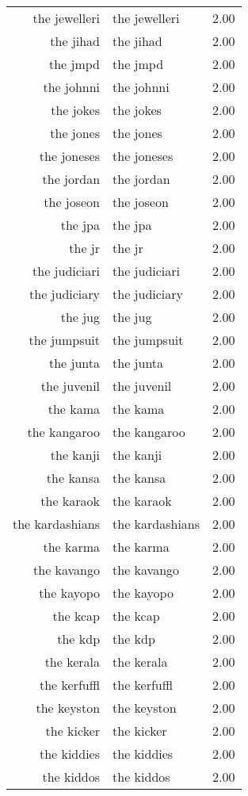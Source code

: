 \begin{table}[ht]
\begin{tabular}{rlr}
  the jewelleri & the jewelleri & 2.00 \\ 
  the jihad & the jihad & 2.00 \\ 
  the jmpd & the jmpd & 2.00 \\ 
  the johnni & the johnni & 2.00 \\ 
  the jokes & the jokes & 2.00 \\ 
  the jones & the jones & 2.00 \\ 
  the joneses & the joneses & 2.00 \\ 
  the jordan & the jordan & 2.00 \\ 
  the joseon & the joseon & 2.00 \\ 
  the jpa & the jpa & 2.00 \\ 
  the jr & the jr & 2.00 \\ 
  the judiciari & the judiciari & 2.00 \\ 
  the judiciary & the judiciary & 2.00 \\ 
  the jug & the jug & 2.00 \\ 
  the jumpsuit & the jumpsuit & 2.00 \\ 
  the junta & the junta & 2.00 \\ 
  the juvenil & the juvenil & 2.00 \\ 
  the kama & the kama & 2.00 \\ 
  the kangaroo & the kangaroo & 2.00 \\ 
  the kanji & the kanji & 2.00 \\ 
  the kansa & the kansa & 2.00 \\ 
  the karaok & the karaok & 2.00 \\ 
  the kardashians & the kardashians & 2.00 \\ 
  the karma & the karma & 2.00 \\ 
  the kavango & the kavango & 2.00 \\ 
  the kayopo & the kayopo & 2.00 \\ 
  the kcap & the kcap & 2.00 \\ 
  the kdp & the kdp & 2.00 \\ 
  the kerala & the kerala & 2.00 \\ 
  the kerfuffl & the kerfuffl & 2.00 \\ 
  the keyston & the keyston & 2.00 \\ 
  the kicker & the kicker & 2.00 \\ 
  the kiddies & the kiddies & 2.00 \\ 
  the kiddos & the kiddos & 2.00 \\ 

\end{tabular}
\end{table}
